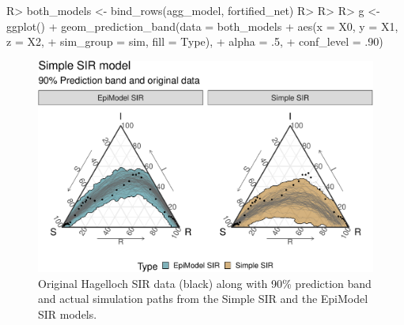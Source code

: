 \documentclass[
  shortnames]{jss}
\begin{document}
\begin{CodeChunk}
\begin{CodeInput}
R> both_models <- bind_rows(agg_model, fortified_net)
R> 
R> 
R> g <- ggplot() + geom_prediction_band(data = both_models %
+          aes(x = X0, y = X1, z = X2,
+               sim_group = sim, fill = Type),
+          alpha = .5,
+          conf_level = .90) 
\end{CodeInput}
\end{CodeChunk}

\begin{CodeChunk}
\begin{figure}[H]

{\centering \includegraphics{Figs/unnamed-chunk-18-1} 

}

\caption{\label{fig:hag-simple-sir}  Original Hagelloch SIR data (black) along with 90\% prediction band and actual simulation paths from the Simple SIR and the EpiModel SIR models.}\label{fig:unnamed-chunk-18}
\end{figure}
\end{CodeChunk}
\end{document}
